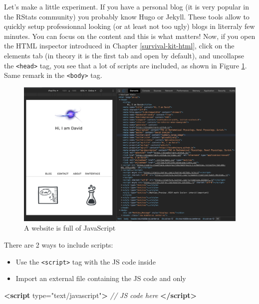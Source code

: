 \documentclass[]{book}
\newenvironment{Shaded}{\begin{snugshade}}{\end{snugshade}}
\newcommand{\CommentTok}[1]{\textcolor[rgb]{0.56,0.35,0.01}{\textit{#1}}}
\newcommand{\KeywordTok}[1]{\textcolor[rgb]{0.13,0.29,0.53}{\textbf{#1}}}
\newcommand{\OtherTok}[1]{\textcolor[rgb]{0.56,0.35,0.01}{#1}}
\newcommand{\StringTok}[1]{\textcolor[rgb]{0.31,0.60,0.02}{#1}}
\providecommand{\tightlist}{%
  \setlength{\itemsep}{0pt}\setlength{\parskip}{0pt}}
\begin{document}
Let's make a little experiment. If you have a personal blog (it is very popular in the RStats community) you probably know Hugo or Jekyll. These tools allow to quickly setup professionnal looking (or at least not too ugly) blogs in literraly few minutes. You can focus on the content and this is what matters! Now, if you open the HTML inspector introduced in Chapter \ref{survival-kit-html}, click on the elements tab (in theory it is the first tab and open by default), and uncollapse the \texttt{\textless{}head\textgreater{}} tag, you see that a lot of scripts are included, as shown in Figure \ref{fig:scripts-list}. Same remark in the \texttt{\textless{}body\textgreater{}} tag.

\begin{figure}
\includegraphics[width=34.86in]{images/survival-kit/scripts-list} \caption{A website is full of JavaScript}\label{fig:scripts-list}
\end{figure}

There are 2 ways to include scripts:

\begin{itemize}
\tightlist
\item
  Use the \texttt{\textless{}script\textgreater{}} tag with the JS code inside
\item
  Import an external file containing the JS code and only
\end{itemize}

\begin{Shaded}
\begin{Highlighting}[]
\KeywordTok{<script}\OtherTok{ type=}\StringTok{"text/javascript"}\KeywordTok{>}
\CommentTok{// JS code here}
\KeywordTok{</script>}
\end{Highlighting}
\end{Shaded}
\end{document}
